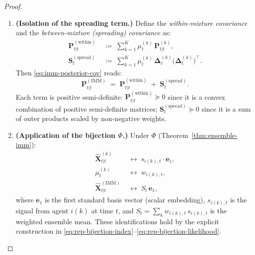 \documentclass[12pt,openany]{book}
\numberwithin{equation}{chapter}
\theoremstyle{plain}
\theoremstyle{definition}
\theoremstyle{remark}
\begin{document}
\begin{proof}
\begin{enumerate}
  \item \textbf{(Isolation of the spreading term.)}
        Define the \emph{within-mixture covariance} and the
        \emph{between-mixture (spreading) covariance} as:
        \begin{align}
          \mathbf{P}_{t|t}^{(\mathrm{within})}
          &\;\coloneqq\;
          \sum_{k=1}^{K} \mu_t^{(k)}\,
          \mathbf{P}_{t|t}^{(k)},
          \label{eq:within-cov-def} \\
          \mathbf{S}_t^{(\mathrm{spread})}
          &\;\coloneqq\;
          \sum_{k=1}^{K} \mu_t^{(k)}\,
          \boldsymbol{\Delta}_t^{(k)}
          \bigl(\boldsymbol{\Delta}_t^{(k)}\bigr)^\top.
          \label{eq:spread-cov-def}
        \end{align}
        Then \eqref{eq:imm-posterior-cov} reads:
        \begin{equation}
          \mathbf{P}_{t|t}^{(\mathrm{IMM})}
          \;=\;
          \mathbf{P}_{t|t}^{(\mathrm{within})}
          \;+\;
          \mathbf{S}_t^{(\mathrm{spread})}.
          \label{eq:imm-cov-two-parts}
        \end{equation}
        Each term is positive semi-definite:
        $\mathbf{P}_{t|t}^{(\mathrm{within})} \succeq 0$ since
        it is a convex combination of positive semi-definite
        matrices; $\mathbf{S}_t^{(\mathrm{spread})} \succeq 0$
        since it is a sum of outer products scaled by
        non-negative weights.

  \item \textbf{(Application of the bijection $\Phi$.)}
        Under $\Phi$ (Theorem~\ref{thm:ensemble-imm}):
        \begin{align}
          \hat{\mathbf{X}}_{t|t}^{(k)}
          &\;\longleftrightarrow\; s_{i(k),t}
          \cdot \mathbf{e}_1,
          \label{eq:bij-state} \\
          \mu_t^{(k)}
          &\;\longleftrightarrow\; w_{i(k),t},
          \label{eq:bij-weight} \\
          \hat{\mathbf{X}}_{t|t}^{(\mathrm{IMM})}
          &\;\longleftrightarrow\;
          S_t\,\mathbf{e}_1,
          \label{eq:bij-mean}
        \end{align}
        where $\mathbf{e}_1$ is the first standard basis vector
        (scalar embedding), $s_{i(k),t}$ is the signal from
        agent $i(k)$ at time $t$, and
        $S_t = \sum_k w_{i(k),t}\,s_{i(k),t}$ is the
        weighted ensemble mean.  These identifications hold
        by the explicit construction in
        \eqref{eq:rep-bijection-index}--\eqref{eq:rep-bijection-likelihood}.


\end{enumerate}
\end{proof}
\end{document}
